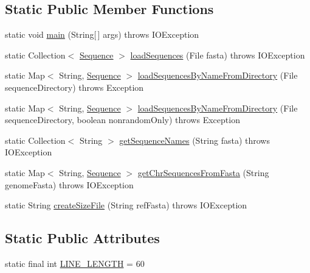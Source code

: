 \subsection*{Static Public Member Functions}
\begin{DoxyCompactItemize}
\item 
static void \hyperlink{classbroad_1_1core_1_1sequence_1_1_fasta_sequence_i_o_aa49fdc72d0f25d8fb26868672544d649}{main} (String\mbox{[}$\,$\mbox{]} args)  throws I\+O\+Exception 
\item 
static Collection$<$ \hyperlink{classbroad_1_1core_1_1sequence_1_1_sequence}{Sequence} $>$ \hyperlink{classbroad_1_1core_1_1sequence_1_1_fasta_sequence_i_o_a913c4cd72c395a0d5c9365174847e4c5}{load\+Sequences} (File fasta)  throws I\+O\+Exception 
\item 
static Map$<$ String, \hyperlink{classbroad_1_1core_1_1sequence_1_1_sequence}{Sequence} $>$ \hyperlink{classbroad_1_1core_1_1sequence_1_1_fasta_sequence_i_o_a82288b1cd1dad27bd6c50b8ed45f3ca4}{load\+Sequences\+By\+Name\+From\+Directory} (File sequence\+Directory)  throws Exception 
\item 
static Map$<$ String, \hyperlink{classbroad_1_1core_1_1sequence_1_1_sequence}{Sequence} $>$ \hyperlink{classbroad_1_1core_1_1sequence_1_1_fasta_sequence_i_o_a900998320d79a2aaa3d9fff9431ceb67}{load\+Sequences\+By\+Name\+From\+Directory} (File sequence\+Directory, boolean nonrandom\+Only)  throws Exception 
\item 
static Collection$<$ String $>$ \hyperlink{classbroad_1_1core_1_1sequence_1_1_fasta_sequence_i_o_add110f97ffec320326f68e49728a41a3}{get\+Sequence\+Names} (String fasta)  throws I\+O\+Exception 
\item 
static Map$<$ String, \hyperlink{classbroad_1_1core_1_1sequence_1_1_sequence}{Sequence} $>$ \hyperlink{classbroad_1_1core_1_1sequence_1_1_fasta_sequence_i_o_a933ca0d02c96ba0321e334ad3431a6cd}{get\+Chr\+Sequences\+From\+Fasta} (String genome\+Fasta)  throws I\+O\+Exception 
\item 
static String \hyperlink{classbroad_1_1core_1_1sequence_1_1_fasta_sequence_i_o_a68327781ab4dee01efe5ff346951f325}{create\+Size\+File} (String ref\+Fasta)  throws I\+O\+Exception 
\end{DoxyCompactItemize}
\subsection*{Static Public Attributes}
\begin{DoxyCompactItemize}
\item 
static final int \hyperlink{classbroad_1_1core_1_1sequence_1_1_fasta_sequence_i_o_a9fd2a01250cf7c4adeda3bb321c0df44}{L\+I\+N\+E\+\_\+\+L\+E\+N\+G\+T\+H} = 60
\end{DoxyCompactItemize}
